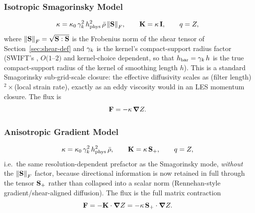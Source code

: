 \subsubsection{Isotropic Smagorinsky Model}
\begin{equation}
  \kappa = \kappa_{0} \, \gamma_{k}^{2} \, h_{\rm phys}^{2} \, \bar\rho \,
            \norm{\mathbf{S}}_F , \qquad
  \mathbf{K} = \kappa \, \mathbf I , \qquad q = Z ,
\end{equation}
where $\norm{\mathbf{S}}_F = \sqrt{\mathbf{S}:\mathbf{S}}$ is the Frobenius norm of
the shear tensor of Section~\ref{sec:shear-def} and $\gamma_{k}$ is the
kernel's compact-support radius factor (SWIFT's ,
$O(1$--$2)$ and kernel-choice dependent, so that
$h_{\rm bar} = \gamma_{k}\, h$ is the true compact-support radius of the
kernel of smoothing length $h$). This is a standard Smagorinsky
sub-grid-scale closure: the effective diffusivity scales as
(filter length)$^2\times$(local strain rate), exactly as an eddy
viscosity would in an LES momentum closure. The flux is
\begin{equation}
  \mathbf{F} = -\kappa \,\grad Z .
\end{equation}

\subsubsection{Anisotropic Gradient Model}
\begin{equation}
  \kappa = \kappa_{0} \, \gamma_{k}^{2} \, h_{\rm phys}^{2} \, \bar\rho , \qquad
  \mathbf{K} = \kappa \, \mathbf{S}_{+} , \qquad q = Z ,
\end{equation}
i.e.\ the same resolution-dependent prefactor as the Smagorinsky mode,
\emph{without} the $\norm{\mathbf{S}}_F$ factor, because directional
information is now retained in full through the tensor $\mathbf{S}_{+}$ rather
than collapsed into a scalar norm (Rennehan-style~\cite{Rennehan2021} gradient/shear-aligned
diffusion). The flux is the full matrix contraction
\begin{equation}
  \mathbf{F} = -\mathbf{K} \cdot \grad Z
         = -\kappa\, \mathbf{S}_{+} \cdot \grad Z .
\end{equation}

